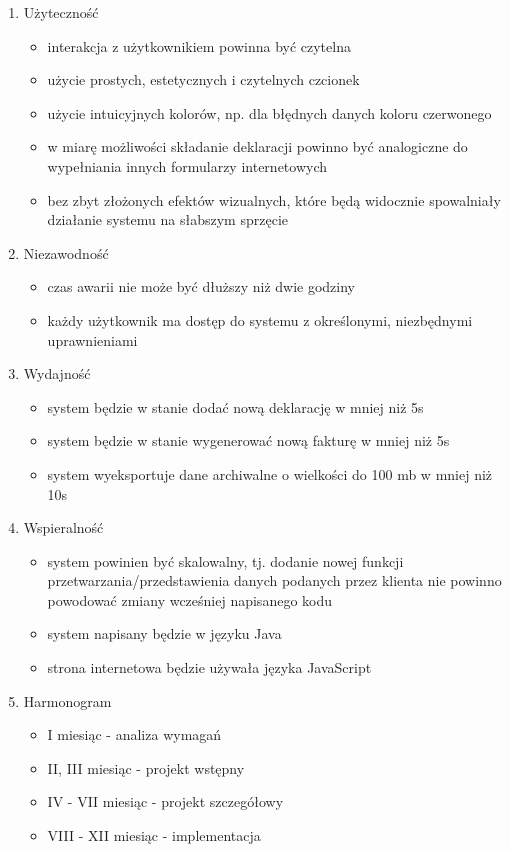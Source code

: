 
\begin{enumerate}
\item Użyteczność
	\begin{itemize}
		\item interakcja z użytkownikiem powinna być czytelna
		\item użycie prostych, estetycznych i czytelnych czcionek
		\item użycie intuicyjnych kolorów, np. dla błędnych danych koloru czerwonego
		\item w miarę możliwości składanie deklaracji powinno być analogiczne do wypełniania innych formularzy internetowych
		\item bez zbyt złożonych efektów wizualnych, które będą widocznie spowalniały działanie systemu na słabszym sprzęcie
	\end{itemize}

\item Niezawodność
	\begin{itemize}
		\item czas awarii nie może być dłuższy niż dwie godziny
		\item każdy użytkownik ma dostęp do systemu z określonymi, niezbędnymi uprawnieniami
	\end{itemize}

\item Wydajność
	\begin{itemize}
		\item system będzie w stanie dodać nową deklarację w mniej niż 5s
		\item system będzie w stanie wygenerować nową fakturę w mniej niż 5s
		\item system wyeksportuje dane archiwalne o wielkości do 100 mb w mniej niż 10s
	\end{itemize}

\item Wspieralność
	\begin{itemize}
		\item system powinien być skalowalny, tj. dodanie nowej funkcji przetwarzania/przedstawienia danych podanych przez klienta nie powinno powodować zmiany wcześniej napisanego kodu
		\item system napisany będzie w języku Java
		\item strona internetowa będzie używała języka JavaScript
	\end{itemize}

\item Harmonogram
	\begin{itemize}
		\item I miesiąc - analiza wymagań
		\item II, III miesiąc - projekt wstępny
		\item IV - VII miesiąc - projekt szczegółowy
		\item VIII - XII miesiąc - implementacja
	\end{itemize}


\end{enumerate}